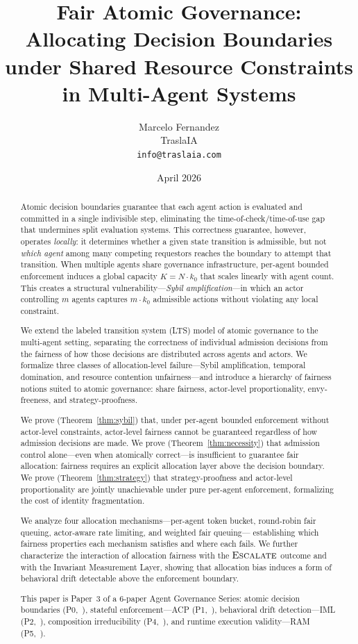 \documentclass[11pt]{article}
\title{Fair Atomic Governance: Allocating Decision Boundaries\\
under Shared Resource Constraints in Multi-Agent Systems}
\author{Marcelo Fernandez\\
TraslaIA\\
\texttt{info@traslaia.com}}
\date{April 2026}
\theoremstyle{plain}
\theoremstyle{definition}
\theoremstyle{remark}
\newcommand{\Escalate}{\textsc{Escalate}}
\newcommand{\kbound}{k_0}                  %
\newcommand{\Kcap}{K}                      %
\begin{document}
\maketitle

\begin{abstract}
Atomic decision boundaries guarantee that each agent action is evaluated
and committed in a single indivisible step, eliminating the
time-of-check/time-of-use gap that undermines split evaluation systems.
This correctness guarantee, however, operates \emph{locally}: it determines
whether a given state transition is admissible, but not \emph{which agent}
among many competing requestors reaches the boundary to attempt that
transition.  When multiple agents share governance infrastructure,
per-agent bounded enforcement induces a global capacity $\Kcap = N \cdot
\kbound$ that scales linearly with agent count.  This creates a structural
vulnerability---\emph{Sybil amplification}---in which an actor controlling
$m$ agents captures $m \cdot \kbound$ admissible actions without violating
any local constraint.

We extend the labeled transition system (LTS) model of atomic governance
to the multi-agent setting, separating the correctness of individual
admission decisions from the fairness of how those decisions are
distributed across agents and actors.  We formalize three classes of
allocation-level failure---Sybil amplification, temporal domination,
and resource contention unfairness---and introduce a hierarchy of fairness
notions suited to atomic governance: share fairness, actor-level
proportionality, envy-freeness, and strategy-proofness.

We prove (Theorem~\ref{thm:sybil}) that, under per-agent bounded enforcement
without actor-level constraints, actor-level fairness cannot be
guaranteed regardless of how admission decisions are made.  We prove
(Theorem~\ref{thm:necessity}) that admission control alone---even when
atomically correct---is insufficient to guarantee fair allocation: fairness
requires an explicit allocation layer above the decision boundary.  We
prove (Theorem~\ref{thm:strategy}) that strategy-proofness and
actor-level proportionality are jointly unachievable under pure per-agent
enforcement, formalizing the cost of identity fragmentation.

We analyze four allocation mechanisms---per-agent token bucket, round-robin
fair queuing, actor-aware rate limiting, and weighted fair queuing---
establishing which fairness properties each mechanism satisfies and where
each fails.  We further characterize the interaction of allocation fairness
with the $\Escalate$ outcome and with the Invariant Measurement Layer,
showing that allocation bias induces a form of behavioral drift detectable
above the enforcement boundary.

This paper is Paper~3 of a 6-paper Agent Governance Series:
atomic decision boundaries (P0,~\citet{fernandez2026a}),
stateful enforcement---ACP (P1,~\citet{fernandez2026b}),
behavioral drift detection---IML (P2,~\citet{fernandez2026c}),
composition irreducibility (P4,~\citet{fernandez2026comp}),
and runtime execution validity---RAM (P5,~\citet{fernandez2026ram}).
\end{abstract}
\end{document}
